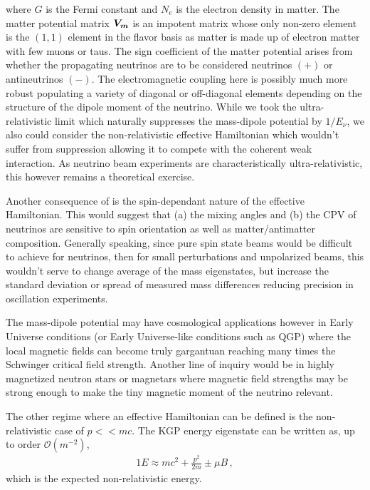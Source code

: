 where $G$ is the Fermi constant and $N_{e}$ is the electron density in matter. The matter potential matrix $\boldsymbol{V_{m}}$ is an impotent matrix whose only non-zero element is the $(1,1)$ element in the flavor basis as matter is made up of electron matter with few muons or taus. \ar The sign coefficient of the matter potential arises from whether the propagating neutrinos are to be considered neutrinos $(+)$ or antineutrinos $(-)$. \ar The electromagnetic coupling here is possibly much more robust populating a variety of diagonal or off-diagonal elements depending on the structure of the dipole moment of the neutrino. While we took the ultra-relativistic limit which naturally suppresses the mass-dipole potential by $1/E_{\nu}$, we also could consider the non-relativistic effective Hamiltonian which wouldn't suffer from suppression allowing it to compete with the coherent weak interaction. As neutrino beam experiments are characteristically ultra-relativistic, this however remains a theoretical exercise. 

Another consequence of  is the spin-dependant nature of the effective Hamiltonian. This would suggest that (a) the mixing angles and (b) the CPV of neutrinos are sensitive to spin orientation as well as matter/antimatter composition. Generally speaking, since pure spin state beams would be difficult to achieve for neutrinos, then for small perturbations and unpolarized beams, this wouldn't serve to change average of the mass eigenstates, but increase the standard deviation or spread of measured mass differences reducing precision in oscillation experiments.

The mass-dipole potential may have cosmological applications however in Early Universe conditions (or Early Universe-like conditions such as QGP) where the local magnetic fields can become truly gargantuan reaching many times the Schwinger critical field strength. \ar Another line of inquiry would be in highly magnetized neutron stars or magnetars \ar where magnetic field strengths may be strong enough to make the tiny magnetic moment of the neutrino relevant.

The other regime where an effective Hamiltonian can be defined is the non-relativistic case of $p<<mc$. The KGP energy eigenstate  can be written as, up to order $\mathcal{O}(m^{-2})$,
\begin{alignat}{1}
	\label{nonrel:1} E\approx mc^{2}+\frac{p^{2}}{2m}\pm\mu B\,,
\end{alignat}
which is the expected non-relativistic energy.


